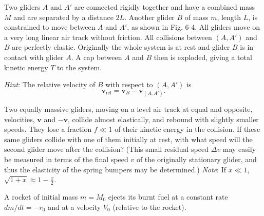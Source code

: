 \documentclass[../feynman-lectures-on-physics.tex]{subfiles}
\begin{document}
\begin{questions}
	\question Two gliders $A$ and $A'$ are connected rigidly together and have a combined mass $M$ and are separated by a distance $2L$. Another glider $B$ of mass $m$, length $L$, is constrained to move between $A$ and $A'$, as shown in Fig. 6-4. All gliders move on a very long linear air track without friction. All collisions between $(A,A')$ and $B$ are perfectly elastic. Originally the whole system is at rest and glider $B$ is in contact with glider $A$. A cap between $A$ and $B$ then is exploded, giving a total kinetic energy $T$ to the system.
	\textit{Hint}: The relative velocity of $B$ with respect to $(A,A')$ is
	\[
		\mathbf{v}_{\text{rel}} = \mathbf{v}_B - \mathbf{v}_{(A,A')}
	.\] 

	\question Two equally massive gliders, moving on a level air track at equal and opposite, velocities, $\mathbf{v}$ and $-\mathbf{v}$, collide almost elastically, and rebound with slightly smaller speeds. They lose a fraction $f \ll 1$ of their kinetic energy in the collision. If these same gliders collide with one of them initially at rest, with what speed will the second glider move after the collision? (This small residual speed $\Delta{v}$ may easily be measured in terms of the final speed $v$ of the originally stationary glider, and thus the elasticity of the spring bumpers may be determined.)
	\textit{Note}: If $x \ll 1$, $\sqrt{1 + x} \approx 1 - \frac{x}{2}$.

	\question A rocket of initial mass $m = M_0$ ejects its burnt fuel at a constant rate $dm/dt = -r_0$ and at a velocity $V_0$ (relative to the rocket).
\end{questions}
\end{document}
